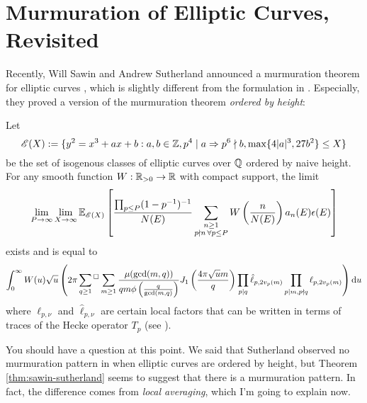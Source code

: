 \section{Murmuration of Elliptic Curves, Revisited}
\label{sec:elliptic2}

Recently, Will Sawin and Andrew Sutherland announced a murmuration theorem for elliptic curves \cite{sawin2025murmurations}, which is slightly different from the formulation in \cite{he2024murmurations}.
Especially, they proved a version of the murmuration theorem \emph{ordered by height}:


\begin{theorem}
    \label{thm:sawin-sutherland}
    Let 
    \[
    \mathscr{E}(X) := \{y^2 = x^3 + ax + b: a, b \in \mathbb{Z}, p^4 \mid a \Rightarrow p^6 \nmid b, \max\{4|a|^3, 27 b^2\} \le X\}
    \]
    be the set of isogenous classes of elliptic curves over $\mathbb{Q}$ ordered by naive height.
    For any smooth function $W : \mathbb{R}_{>0} \to \mathbb{R}$ with compact support, the limit
    \begin{equation}
        \lim_{P \to \infty }\lim_{X \to \infty} \mathbb{E}_{\mathscr{E}(X)} \left[ \frac{\prod_{p \le P}(1 - p^{-1})^{-1}}{N(E)} \sum_{\substack{n \ge 1 \\ p \nmid n \,\forall p \le P}} W\left(\frac{n}{N(E)}\right) a_n(E) \epsilon(E)\right]
    \end{equation}
    exists and is equal to
    \begin{equation}
        \int_{0}^{\infty} W(u) \sqrt{u} \left(2\pi \sideset{}{{}^\square}\sum_{q \ge 1} \sum_{m \ge 1} \frac{\mu(\gcd(m,q))}{qm \phi\left(\frac{q}{\gcd(m,q)}\right)} J_1 \left(\frac{4 \pi \sqrt{u}m}{q}\right) \prod_{p \mid q} \hat{\ell}_{p, 2v_p(m)} \prod_{p \mid m, p \nmid q} \ell_{p, 2v_p(m)} \right) \mathrm{d} u
    \end{equation}
    where $\ell_{p, \nu}$ and $\hat{\ell}_{p, \nu}$ are certain local factors that can be written in terms of traces of the Hecke operator $T_p$ (see \cite[Lemma 3, 4]{sawin2025murmurations}).
\end{theorem}

You should have a question at this point.
We said that Sutherland observed no murmuration pattern in \cite{sutherlandletter} when elliptic curves are ordered by height, but Theorem \ref{thm:sawin-sutherland} seems to suggest that there is a murmuration pattern.
In fact, the difference comes from \emph{local averaging}, which I'm going to explain now.

